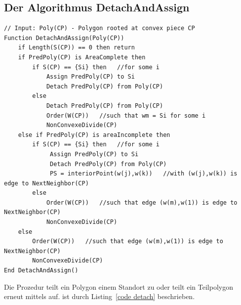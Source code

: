 \documentclass[ngerman]{seminarbeitrag}
\begin{document}
\subsection{Der Algorithmus DetachAndAssign}\label{detach}

\begin{lstlisting}[float,caption={Der Algorithmus \daa}, frame=single, label=code detach]
// Input: Poly(CP) - Polygon rooted at convex piece CP
Function DetachAndAssign(Poly(CP))
    if Length(S(CP)) == 0 then return 
    if PredPoly(CP) is AreaComplete then
        if S(CP) == {Si} then   //for some i
            Assign PredPoly(CP) to Si
            Detach PredPoly(CP) from Poly(CP)
        else
            Detach PredPoly(CP) from Poly(CP)
            Order(W(CP))   //such that wm = Si for some i
            NonConvexeDivide(CP)
    else if PredPoly(CP) is areaIncomplete then
        if S(CP) == {Si} then	//for some i
             Assign PredPoly(CP) to Si
             Detach PredPoly(CP) from Poly(CP)
             PS = interiorPoint(w(j),w(k))   //with (w(j),w(k)) is edge to NextNeighbor(CP)
        else
            Order(W(CP))   //such that edge (w(m),w(1)) is edge to NextNeighbor(CP)
            NonConvexeDivide(CP)
    else
        Order(W(CP))   //such that edge (w(m),w(1)) is edge to NextNeighbor(CP)
        NonConvexeDivide(CP)
End DetachAndAssign()

\end{lstlisting}

Die Prozedur \daa teilt ein Polygon einem Standort zu oder teilt ein Teilpolygon erneut mittels \noncon auf. \daa ist durch Listing~\ref{code detach} beschrieben.
\end{document}
